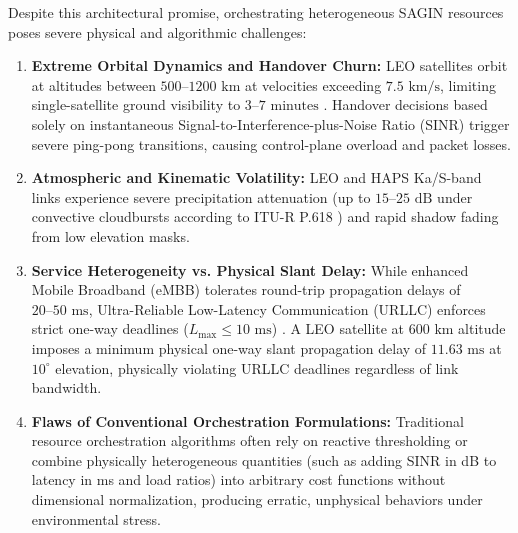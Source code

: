 \documentclass[conference]{IEEEtran}
\begin{document}
Despite this architectural promise, orchestrating heterogeneous SAGIN resources poses severe physical and algorithmic challenges:
\begin{enumerate}
    \item \textbf{Extreme Orbital Dynamics and Handover Churn:} LEO satellites orbit at altitudes between $500\text{--}1200\text{ km}$ at velocities exceeding $7.5\text{ km/s}$, limiting single-satellite ground visibility to $3\text{--}7\text{ minutes}$ \cite{di2021ultra, risi2022predictive}. Handover decisions based solely on instantaneous Signal-to-Interference-plus-Noise Ratio (SINR) trigger severe ping-pong transitions, causing control-plane overload and packet losses.
    \item \textbf{Atmospheric and Kinematic Volatility:} LEO and HAPS Ka/S-band links experience severe precipitation attenuation (up to $15\text{--}25\text{ dB}$ under convective cloudbursts according to ITU-R P.618 \cite{itur_p618}) and rapid shadow fading from low elevation masks.
    \item \textbf{Service Heterogeneity vs. Physical Slant Delay:} While enhanced Mobile Broadband (eMBB) tolerates round-trip propagation delays of $20\text{--}50\text{ ms}$, Ultra-Reliable Low-Latency Communication (URLLC) enforces strict one-way deadlines ($L_{\text{max}} \le 10\text{ ms}$) \cite{3gpp_tr38811}. A LEO satellite at $600\text{ km}$ altitude imposes a minimum physical one-way slant propagation delay of $11.63\text{ ms}$ at $10^\circ$ elevation, physically violating URLLC deadlines regardless of link bandwidth.
    \item \textbf{Flaws of Conventional Orchestration Formulations:} Traditional resource orchestration algorithms often rely on reactive thresholding or combine physically heterogeneous quantities (such as adding SINR in dB to latency in ms and load ratios) into arbitrary cost functions without dimensional normalization, producing erratic, unphysical behaviors under environmental stress.
\end{enumerate}
\end{document}
